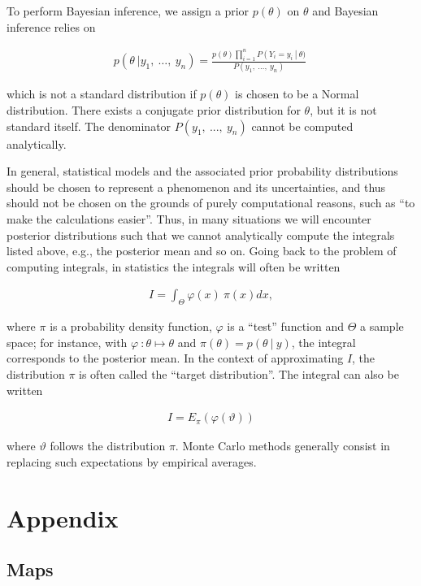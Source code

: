 To perform Bayesian inference, we assign a prior \(p(\theta)\) on
\(\theta\) and Bayesian inference relies on

\begin{align}p(\theta\ |y_{1},\ \ldots,\ y_{n}) = \frac{p(\theta)\prod_{i = 1}^{n}{P\left( Y_{i} = y_{i}\  \right|\ \theta)}}{P(y_{1},\ \ldots,\ y_{n})}\ \end{align}

which is not a standard distribution if \(p(\theta)\) is chosen to be a
Normal distribution. There exists a conjugate prior distribution for
\(\theta\), but it is not standard itself. The denominator
\(P(y_{1},\ ...,\ y_{n})\) cannot be computed analytically.

In general, statistical models and the associated prior probability
distributions should be chosen to represent a phenomenon and its
uncertainties, and thus should not be chosen on the grounds of purely
computational reasons, such as ``to make the calculations easier''.
Thus, in many situations we will encounter posterior distributions such
that we cannot analytically compute the integrals listed above, e.g.,
the posterior mean and so on. Going back to the problem of computing
integrals, in statistics the integrals will often be written

\begin{align}I = \int_{\Theta}^{}{\varphi(x)\ \pi(x)}dx,\end{align}

where \(\pi\) is a probability density function, \(\varphi\) is a
``test'' function and \(\Theta\) a sample space; for instance, with
\(\varphi\ :\theta \mapsto \theta\) and
\(\pi(\theta) = p(\theta\ |\ y)\), the integral corresponds to the
posterior mean. In the context of approximating \(I\), the distribution
\(\pi\) is often called the ``target distribution''. The integral can
also be written

\begin{align}I = E_{\pi}\left( \varphi(\vartheta) \right)\end{align}

where \(\vartheta\) follows the distribution \(\pi\). Monte Carlo
methods generally consist in replacing such expectations by empirical
averages.

\section{Appendix}

\subsection{Maps}

